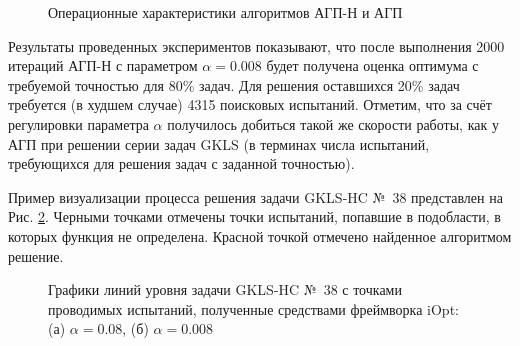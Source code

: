 \documentclass[a4paper,12pt,russian]{article}
\begin{document}
\begin{figure}[h!]
	\caption{Операционные характеристики алгоритмов АГП-Н и АГП}
	\label{oper_charact}
\end{figure}

Результаты проведенных экспериментов показывают, что после выполнения 2000 итераций АГП-Н с параметром $\alpha = 0.008$ будет получена оценка оптимума с требуемой точностью для 80\% задач. Для решения оставшихся 20\% задач требуется (в худшем случае) 4315 поисковых испытаний. Отметим, что за счёт регулировки параметра $\alpha$ получилось добиться такой же скорости работы, как у  АГП при решении серии задач GKLS (в терминах числа испытаний, требующихся для решения задач с заданной точностью).

Пример визуализации процесса решения задачи GKLS-HC №~38 представлен на Рис. \ref{iOpt_result}. Черными точками отмечены точки испытаний, попавшие в подобласти, в которых функция не определена. Красной точкой отмечено найденное алгоритмом решение.

\begin{figure}[h!]
	\caption{Графики линий уровня задачи GKLS-HC №~38 с точками проводимых испытаний, полученные средствами фреймворка iOpt: (а) $\alpha = 0.08$, (б) $\alpha = 0.008$ }
	\label{iOpt_result}
\end{figure}
\end{document}
